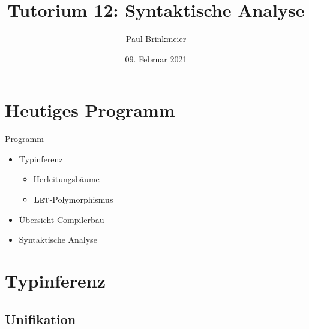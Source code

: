 \documentclass{beamer}
\title{Tutorium 12: Syntaktische Analyse}
\author{Paul Brinkmeier}
\institute{Tutorium Programmierparadigmen am KIT}
\date{09. Februar 2021}
\begin{document}
\begin{frame}
	\titlepage
\end{frame}

\section{Heutiges Programm}

\begin{frame}{Programm}
	\begin{itemize}
          \item Typinferenz
          \begin{itemize}
            \item Herleitungsbäume
            \item $\textsc{Let}$-Polymorphismus
          \end{itemize}
          \item Übersicht Compilerbau
          \item Syntaktische Analyse
	\end{itemize}
\end{frame}

\section{Typinferenz}

\subsection{Unifikation}

{

}
\end{document}
